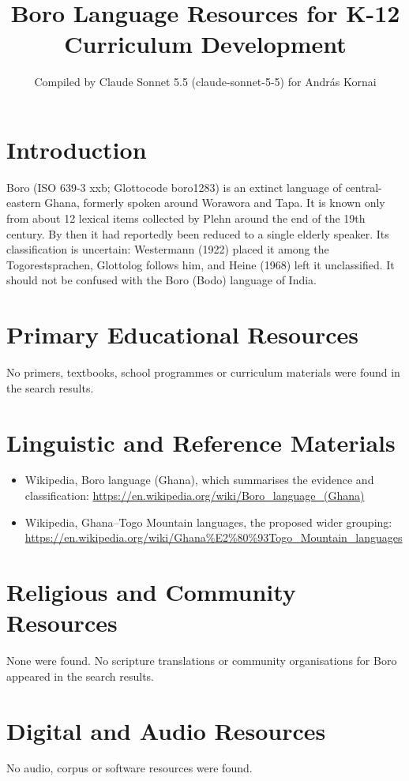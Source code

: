 \documentclass[12pt]{article}
\title{Boro Language Resources for K-12 Curriculum Development}
\author{Compiled by Claude Sonnet 5.5 (claude-sonnet-5-5) for Andr\'as Kornai}
\date{}
\begin{document}
\maketitle

\section{Introduction}
Boro (ISO 639-3 xxb; Glottocode boro1283) is an extinct language of central-eastern Ghana, formerly spoken around Worawora and Tapa. It is known only from about 12 lexical items collected by Plehn around the end of the 19th century. By then it had reportedly been reduced to a single elderly speaker. Its classification is uncertain: Westermann (1922) placed it among the Togorestsprachen, Glottolog follows him, and Heine (1968) left it unclassified. It should not be confused with the Boro (Bodo) language of India.

\section{Primary Educational Resources}
No primers, textbooks, school programmes or curriculum materials were found in the search results.

\section{Linguistic and Reference Materials}
\begin{itemize}
\item Wikipedia, Boro language (Ghana), which summarises the evidence and classification: \url{https://en.wikipedia.org/wiki/Boro_language_(Ghana)}
\item Wikipedia, Ghana--Togo Mountain languages, the proposed wider grouping: \url{https://en.wikipedia.org/wiki/Ghana%E2%80%93Togo_Mountain_languages}
\end{itemize}

\section{Religious and Community Resources}
None were found. No scripture translations or community organisations for Boro appeared in the search results.

\section{Digital and Audio Resources}
No audio, corpus or software resources were found.
\end{document}
